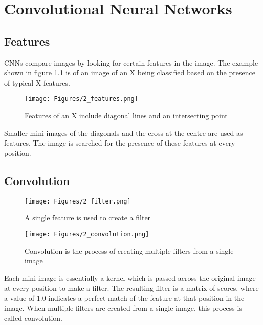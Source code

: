 
\chapter{Convolutional Neural Networks} %

\label{AppendixA} %

\section*{Features}
CNNs compare images by looking for certain features in the image. The example shown in figure \ref{fig:2:features} is of an image of an X being classified based on the presence of typical X features.

\begin{figure}[!ht]
\centering
\texttt{[image: Figures/2\_features.png]}
\decoRule
\caption[Features of an image]{Features of an X include diagonal lines and an intersecting point \parencite{convolution2}}
\label{fig:2:features}
\end{figure}

Smaller mini-images of the diagonals and the cross at the centre are used as features. The image is searched for the presence of these features at every position.

\section*{Convolution}

\begin{figure}[!ht]
\centering
\texttt{[image: Figures/2\_filter.png]}
\decoRule
\caption[Image Filter]{A single feature is used to create a filter \parencite{convolution2}}
\label{fig:2:filter}
\end{figure}

\begin{figure}[!ht]
\centering
\texttt{[image: Figures/2\_convolution.png]}
\decoRule
\caption[Convolution]{Convolution is the process of creating multiple filters from a single image \parencite{convolution2}}
\label{fig:2:convolution}
\end{figure}

Each mini-image is essentially a kernel which is passed across the original image at every position to make a filter.
The resulting filter is a matrix of scores, where a value of 1.0 indicates a perfect match of the feature at that position in the image. When multiple filters are created from a single image, this process is called convolution.

